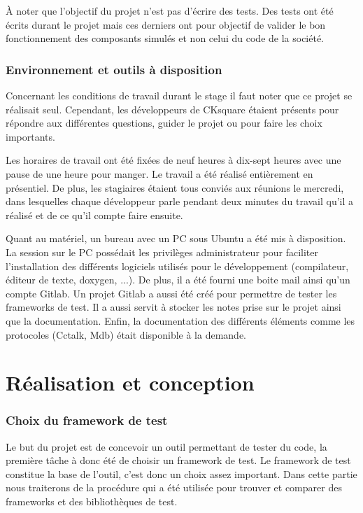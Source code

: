 \documentclass[a4paper]{article}
\begin{document}
À noter que l'objectif du projet n'est pas d'écrire des tests. Des tests ont été
écrits durant le projet mais ces derniers ont pour objectif de valider le bon
fonctionnement des composants simulés et non celui du code de la société.
\section{Environnement et outils à disposition}%

Concernant les conditions de travail durant le stage il faut noter que ce projet
se réalisait seul. Cependant, les développeurs de CKsquare étaient présents pour
répondre aux différentes questions, guider le projet ou pour faire les choix
importants.

Les horaires de travail ont été fixées de neuf heures à dix-sept heures avec une
pause de une heure pour manger. Le travail a été réalisé entièrement en
présentiel. De plus, les stagiaires étaient tous conviés aux réunions le
mercredi, dans lesquelles chaque développeur parle pendant deux minutes du
travail qu'il a réalisé et de ce qu'il compte faire ensuite.

Quant au matériel, un bureau avec un PC sous Ubuntu a été mis à disposition. La
session sur le PC possédait les privilèges administrateur pour faciliter
l'installation des différents logiciels utilisés pour le développement
(compilateur, éditeur de texte, doxygen, ...). De plus, il a été fourni une
boite mail ainsi qu'un compte Gitlab. Un projet Gitlab a aussi été créé pour
permettre de tester les frameworks de test. Il a aussi servit à stocker les
notes prise sur le projet ainsi que la documentation. Enfin, la documentation
des différents éléments comme les protocoles (Cctalk, Mdb) était disponible à la
demande.
\clearpage
\part{Réalisation et conception}

\section{Choix du framework de test}

Le but du projet est de concevoir un outil permettant de tester du code, la
première tâche à donc été de choisir un framework de test. Le framework de test
constitue la base de l'outil, c'est donc un choix assez important. Dans cette
partie nous traiterons de la procédure qui a été utilisée pour trouver et
comparer des frameworks et des bibliothèques de test.
\end{document}
